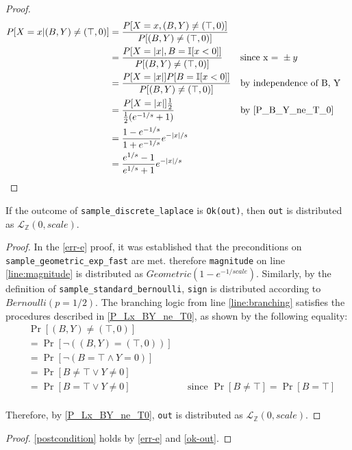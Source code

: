 \documentclass{article}
\begin{document}
\begin{proof} 
\begin{align*} 
P[X = x | (B, Y) \neq (\top, 0)] &= \frac{P[X = x, (B, Y) \neq (\top, 0)]}{P[(B, Y) \neq (\top, 0)]} \\ 
    &= \frac{P[X = |x|, B = \mathbb{I}[x < 0]]}{P[(B, Y) \neq (\top, 0)]} && \text{since x = }\pm y \\ 
    &= \frac{P[X = |x|] P[B = \mathbb{I}[x < 0]]}{P[(B, Y) \neq (\top, 0)]} && \text{by independence of B, Y} \\ 
    &= \frac{P[X = |x|] \frac{1}{2}}{\frac{1}{2} (e^{-1/s} + 1)} && \text{by } \ref{P_B_Y_ne_T_0} \\ 
    &= \frac{1 - e^{-1/s}}{1 + e^{-1/s}} e^{-|x|/s} \\ 
    &= \frac{e^{1/s} - 1}{e^{1/s} + 1} e^{-|x|/s} \\ 
\end{align*} 
\end{proof} 
 
\begin{lemma}\label{ok-out} 
    If the outcome of \texttt{sample\_discrete\_laplace} is \texttt{Ok(out)},  
    then \texttt{out} is distributed as $\mathcal{L}_\mathbb{Z}(0, scale)$. 
\end{lemma} 
 
\begin{proof} 
    In the \ref{err-e} proof, it was established that the preconditions on \texttt{sample\_geometric\_exp\_fast} are met. 
    therefore \texttt{magnitude} on line \ref{line:magnitude} is distributed as $ Geometric(1 - e^{-1/scale})$. 
    Similarly, by the definition of \texttt{sample\_standard\_bernoulli}, \texttt{sign} is distributed according to $Bernoulli(p=1/2)$. 
    The branching logic from line \ref{line:branching} satisfies the procedures described in \ref{P_Lx_BY_ne_T0}, as shown by the following equality: 
    \begin{align*}
        &\Pr[(B,Y) \neq (\top,0)] \\
        &= \Pr[\neg((B, Y) = (\top, 0))] \\ 
        &= \Pr[\neg(B=\top \wedge Y=0)] \\
        &= \Pr[B\neq\top \vee Y\neq 0] \\
        &= \Pr[B = \top \vee Y\neq 0] && \text{since } \Pr[B \neq \top] = \Pr[B = \top]\\
    \end{align*}

    Therefore, by \ref{P_Lx_BY_ne_T0}, \texttt{out} is distributed as $\mathcal{L}_\mathbb{Z}(0, scale)$. 
\end{proof} 
 
\begin{proof} 
    \ref{postcondition} holds by \ref{err-e} and \ref{ok-out}. 
\end{proof} 
 
 
 
 
 
\end{document}
